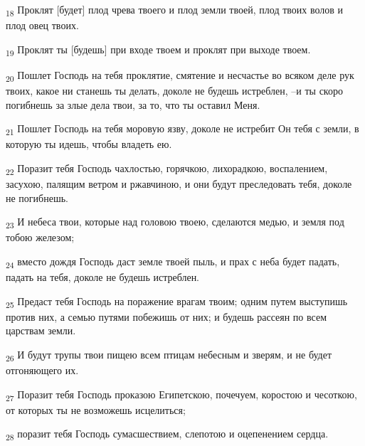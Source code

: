 \begin{tcolorbox}
\textsubscript{18} Проклят [будет] плод чрева твоего и плод земли твоей, плод твоих волов и плод овец твоих.
\end{tcolorbox}
\begin{tcolorbox}
\textsubscript{19} Проклят ты [будешь] при входе твоем и проклят при выходе твоем.
\end{tcolorbox}
\begin{tcolorbox}
\textsubscript{20} Пошлет Господь на тебя проклятие, смятение и несчастье во всяком деле рук твоих, какое ни станешь ты делать, доколе не будешь истреблен, --и ты скоро погибнешь за злые дела твои, за то, что ты оставил Меня.
\end{tcolorbox}
\begin{tcolorbox}
\textsubscript{21} Пошлет Господь на тебя моровую язву, доколе не истребит Он тебя с земли, в которую ты идешь, чтобы владеть ею.
\end{tcolorbox}
\begin{tcolorbox}
\textsubscript{22} Поразит тебя Господь чахлостью, горячкою, лихорадкою, воспалением, засухою, палящим ветром и ржавчиною, и они будут преследовать тебя, доколе не погибнешь.
\end{tcolorbox}
\begin{tcolorbox}
\textsubscript{23} И небеса твои, которые над головою твоею, сделаются медью, и земля под тобою железом;
\end{tcolorbox}
\begin{tcolorbox}
\textsubscript{24} вместо дождя Господь даст земле твоей пыль, и прах с неба будет падать, падать на тебя, доколе не будешь истреблен.
\end{tcolorbox}
\begin{tcolorbox}
\textsubscript{25} Предаст тебя Господь на поражение врагам твоим; одним путем выступишь против них, а семью путями побежишь от них; и будешь рассеян по всем царствам земли.
\end{tcolorbox}
\begin{tcolorbox}
\textsubscript{26} И будут трупы твои пищею всем птицам небесным и зверям, и не будет отгоняющего их.
\end{tcolorbox}
\begin{tcolorbox}
\textsubscript{27} Поразит тебя Господь проказою Египетскою, почечуем, коростою и чесоткою, от которых ты не возможешь исцелиться;
\end{tcolorbox}
\begin{tcolorbox}
\textsubscript{28} поразит тебя Господь сумасшествием, слепотою и оцепенением сердца.
\end{tcolorbox}
